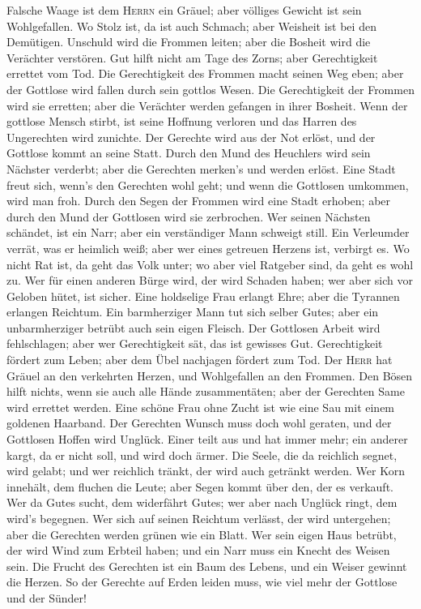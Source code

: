  Falsche Waage ist dem \textsc{Herrn} ein Gräuel; aber
völliges Gewicht ist sein Wohlgefallen.  Wo Stolz ist, da
ist auch Schmach; aber Weisheit ist bei den Demütigen. 
Unschuld wird die Frommen leiten; aber die Bosheit wird die Verächter
verstören.  Gut hilft nicht am Tage des Zorns; aber
Gerechtigkeit errettet vom Tod.  Die Gerechtigkeit des
Frommen macht seinen Weg eben; aber der Gottlose wird fallen durch sein
gottlos Wesen.  Die Gerechtigkeit der Frommen wird sie
erretten; aber die Verächter werden gefangen in ihrer Bosheit.
 Wenn der gottlose Mensch stirbt, ist seine Hoffnung
verloren und das Harren des Ungerechten wird zunichte. 
Der Gerechte wird aus der Not erlöst, und der Gottlose kommt an seine
Statt.  Durch den Mund des Heuchlers wird sein Nächster
verderbt; aber die Gerechten merken's und werden erlöst. 
Eine Stadt freut sich, wenn's den Gerechten wohl geht; und wenn die
Gottlosen umkommen, wird man froh.  Durch den Segen der
Frommen wird eine Stadt erhoben; aber durch den Mund der Gottlosen wird
sie zerbrochen.  Wer seinen Nächsten schändet, ist ein
Narr; aber ein verständiger Mann schweigt still.  Ein
Verleumder verrät, was er heimlich weiß; aber wer eines getreuen Herzens
ist, verbirgt es.  Wo nicht Rat ist, da geht das Volk
unter; wo aber viel Ratgeber sind, da geht es wohl zu. 
Wer für einen anderen Bürge wird, der wird Schaden haben; wer aber sich
vor Geloben hütet, ist sicher.  Eine holdselige Frau
erlangt Ehre; aber die Tyrannen erlangen Reichtum.  Ein
barmherziger Mann tut sich selber Gutes; aber ein unbarmherziger betrübt
auch sein eigen Fleisch.  Der Gottlosen Arbeit wird
fehlschlagen; aber wer Gerechtigkeit sät, das ist gewisses Gut.
 Gerechtigkeit fördert zum Leben; aber dem Übel nachjagen
fördert zum Tod.  Der \textsc{Herr} hat Gräuel an den
verkehrten Herzen, und Wohlgefallen an den Frommen.  Den
Bösen hilft nichts, wenn sie auch alle Hände zusammentäten; aber der
Gerechten Same wird errettet werden.  Eine schöne Frau
ohne Zucht ist wie eine Sau mit einem goldenen Haarband. 
Der Gerechten Wunsch muss doch wohl geraten, und der Gottlosen Hoffen
wird Unglück.  Einer teilt aus und hat immer mehr; ein
anderer kargt, da er nicht soll, und wird doch ärmer. 
Die Seele, die da reichlich segnet, wird gelabt; und wer reichlich
tränkt, der wird auch getränkt werden.  Wer Korn
innehält, dem fluchen die Leute; aber Segen kommt über den, der es
verkauft.  Wer da Gutes sucht, dem widerfährt Gutes; wer
aber nach Unglück ringt, dem wird's begegnen.  Wer sich
auf seinen Reichtum verlässt, der wird untergehen; aber die Gerechten
werden grünen wie ein Blatt.  Wer sein eigen Haus
betrübt, der wird Wind zum Erbteil haben; und ein Narr muss ein Knecht
des Weisen sein.  Die Frucht des Gerechten ist ein Baum
des Lebens, und ein Weiser gewinnt die Herzen.  So der
Gerechte auf Erden leiden muss, wie viel mehr der Gottlose und der
Sünder!

